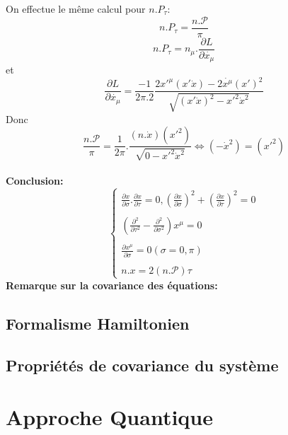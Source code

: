 \documentclass[a4paper,12pt]{article}
\def\xmu{x^\mu}
\begin{document}
On effectue le même calcul pour $n.P_\tau$:
$$n.P_\tau=\frac{n.\mathcal{P}}{\pi}$$
$$n.P_\tau=n_\mu.\frac{\partial L}{\partial \dot{x_\mu}}$$
et $$\frac{\partial L}{\partial \dot{x_\mu}}=\frac{-1}{2\pi.2}\frac{2x'^\mu(x'\dot{x})-2\dot{\xmu} (x')^2}{\sqrt{(x'\dot{x})^2-x'^2\dot{x}^2}}$$
Donc $$\frac{n.\mathcal{P}}{\pi}=\frac{1}{2\pi}.\frac{(n.\dot{x})(x'^2)}{\sqrt{0-x'^2\dot{x}^2}} \Leftrightarrow (-\dot{x}^2)=(x'^2)$$\\
\textbf{Conclusion:}
\begin{equation}
      \begin{cases}
        \frac{\partial x}{\partial \sigma}.\frac{\partial x}{\partial \tau}=0, \left( \frac{\partial x}{\partial \sigma}\right) ^2+\left( \frac{\partial x}{\partial \tau}\right) ^2=0\\
        \\
        \left( \frac{\partial^2}{\partial  \tau^2}-\frac{\partial^2}{\partial  \sigma^2}\right) \xmu=0\\
        \\
        \frac{\partial \xmu}{\partial \sigma}=0 	 (\sigma=0,\pi)\\
        \\
        n.x=2(n.\mathcal{P})\tau
      \end{cases}
\end{equation}
\textbf{Remarque sur la covariance des équations:}
\subsection{Formalisme Hamiltonien}
\subsection{Propriétés de covariance du système}
\section{Approche Quantique}
\end{document}
